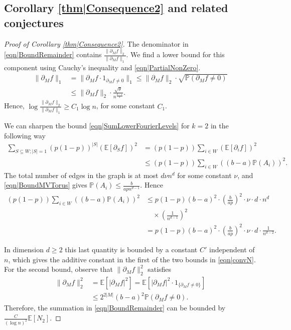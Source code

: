\documentclass[reqno]{amsart}
\begin{document}
\subsection{Corollary \ref{thm|Consequence2} and related conjectures}\label{subs|CorollaryAndConjectures}
\begin{proof}[Proof of Corollary \ref{thm|Consequence2}] 
The denominator in \eqref{eqn|BoundRemainder} contains $\frac{\|\partial_Mf\|_2}{\|\partial_Mf\|_1}$. We find a lower bound for this component using Cauchy's inequality and \eqref{eqn|PartialNonZero}. 
\begin{align*}
\|\partial_Mf\|_1&=\|\partial_M f\cdot 1_{\partial_Mf\neq 0}\|_1\leq 
\|\partial_M f\|_2\cdot \sqrt{\mathbb P\left(\partial_Mf\neq 0\right)}\\
&\leq \|\partial_M f\|_2\cdot \frac{\sqrt {\theta}}{n^{\frac{d-1}2}}.
\end{align*}
Hence, $\log \frac{\|\partial_Mf\|_2}{\|\partial_Mf\|_1}\geq C_1 \log n$, for some constant $C_1$.


We can sharpen the bound \eqref{eqn|SumLowerFourierLevels} for $k=2$ in the following way  
\begin{align*}\sum_{S\subseteq W;  |S|=1}(p(1-p))^{|S|}\left(\mathbb E\left[\partial_Sf\right]\right)^2 &=
(p(1-p))\sum_{i\in W}\left(\mathbb E\left[\partial_if\right]\right)^2
\\&\leq (p(1-p))\sum_{i\in W}\left((b-a)\mathbb P(A_i)\right)^2.\end{align*}
The total number of edges in the graph is at most $d\nu n^d$ for some constant $\nu$, and \eqref{eqn|BoundMVTorus} gives $\mathbb P(A_i)\leq \frac{b}{apn^{d-1}}$. Hence
\begin{align*}
(p(1-p))\sum_{i\in W}\left((b-a)\mathbb P(A_i)\right)^2 &\leq p(1-p)(b-a)^2\cdot \left(\frac{b}{ap}\right)^2 \cdot\nu\cdot d\cdot n^{d}
\\
&\quad
\times  \left(\frac1{n^{d-1}}\right)^2\\
&=p(1-p)(b-a)^2\cdot\left(\frac{b}{ap}\right)^2\cdot\nu\cdot d\cdot \frac1{n^{d-2}}.
\end{align*}

In dimension $d\geq 2$ this last quantity is bounded by a constant $C'$ independent of $n$, which gives the additive constant in the first of the two bounds in \eqref{eqn|convN}. For the second bound, 
observe that $\|\partial_Mf\|_2^2$ satisfies
\begin{align*}\|\partial_Mf\|_2^2&=\mathbb E\left[|\partial_Mf|^2\right]=\mathbb E\left[|\partial_Mf|^2\cdot 1_{\{\partial_Mf\neq 0\}}\right]\\
&\leq2^{2|M|}(b-a)^2\mathbb P(\partial_M f\neq 0).
\end{align*} 
Therefore, the summation in \eqref{eqn|BoundRemainder}
can be bounded by $\frac{C}{(\log n)^2}\mathbb E\left[N_2\right]$.


\end{proof}
\end{document}
